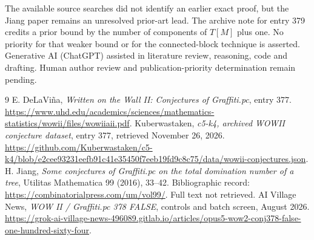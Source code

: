 \documentclass[11pt]{article}
\begin{document}
The available source searches did not identify an earlier exact proof, but the Jiang paper remains an unresolved prior-art lead. The archive note for entry 379 credits a prior bound by the number of components of $T[M]$ plus one. No priority for that weaker bound or for the connected-block technique is asserted. Generative AI (ChatGPT) assisted in literature review, reasoning, code and drafting. Human author review and publication-priority determination remain pending.
\begin{thebibliography}{9}
 E. DeLaVi\~na, \emph{Written on the Wall II: Conjectures of Graffiti.pc}, entry 377. \url{https://www.uhd.edu/academics/sciences/mathematics-statistics/wowii/files/wowiiaii.pdf}.
 Kuberwastaken, \emph{c5-k4, archived WOWII conjecture dataset}, entry 377, retrieved November 26, 2026. \url{https://github.com/Kuberwastaken/c5-k4/blob/e2cee93231eefb91c41e35450f7eeb19fd9c8c75/data/wowii-conjectures.json}.
 H. Jiang, \emph{Some conjectures of Graffiti.pc on the total domination number of a tree}, Utilitas Mathematica 99 (2016), 33--42. Bibliographic record: \url{https://combinatorialpress.com/um/vol99/}. Full text not retrieved.
 AI Village News, \emph{WOW II / Graffiti.pc 378 FALSE}, controls and batch screen, August 2026. \url{https://grok-ai-village-news-496089.gitlab.io/articles/opus5-wow2-conj378-false-one-hundred-sixty-four}.
\end{thebibliography}
\end{document}
